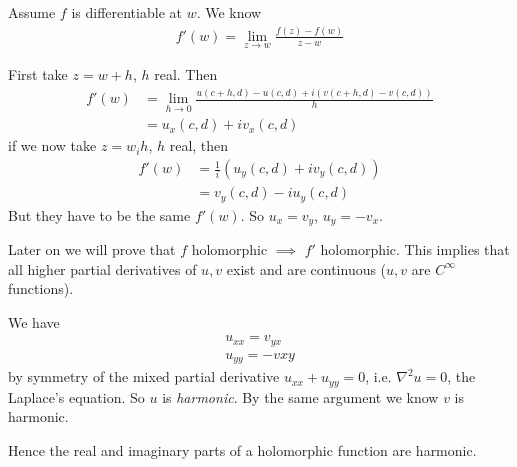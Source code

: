 \documentclass[a4paper]{article}
\begin{document}
\begin{rem}
Assume $f$ is differentiable at $w$. We know
\begin{equation*}
\begin{aligned}
f'(w) = \lim_{z \to w} \frac{f(z)-f(w)}{z-w}
\end{aligned}
\end{equation*}


First take $z=w+h$, $h$ real. Then
\begin{equation*}
\begin{aligned}
f'(w) &= \lim_{h \to 0} \frac{u(c+h,d)-u(c,d)+i(v(c+h,d)-v(c,d))}{h}\\
&= u_x(c,d)+iv_x(c,d)
\end{aligned}
\end{equation*}
if we now take $z=w_ih$, $h$ real, then
\begin{equation*}
\begin{aligned}
f'(w) &= \frac{1}{i} (u_y(c,d)+iv_y(c,d))\\
&=v_y(c,d)-iu_y(c,d)
\end{aligned}
\end{equation*}
But they have to be the same $f'(w)$. So $u_x=v_y$, $u_y=-v_x$.

\end{rem}

\begin{rem}
Later on we will prove that $f$ holomorphic $\implies$ $f'$ holomorphic. This implies that all higher partial derivatives of $u,v$ exist and are continuous ($u,v$ are $C^\infty$ functions).

We have
\begin{equation*}
\begin{aligned}
u_{xx} = v_{yx}\\
u_{yy} = -v{xy}
\end{aligned}
\end{equation*}
by symmetry of the mixed partial derivative $u_{xx}+u_{yy}=0$, i.e. $\nabla^2 u=0$, the Laplace's equation. So $u$ is \emph{harmonic}. By the same argument we know $v$ is harmonic.

Hence the real and imaginary parts of a holomorphic function are harmonic.
\end{rem}
\end{document}
